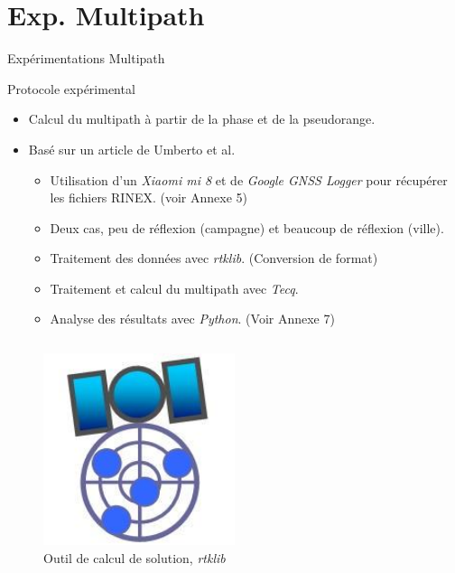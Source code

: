 \documentclass[xcolor=dvipsnames,envcountsect]{beamer}
\begin{document}
\section{Exp. Multipath}
\begin{frame}
	\centering
	\begin{block}
		\scshape
		\begin{center}
			\Huge Expérimentations Multipath
		\end{center}
	\end{block}
\end{frame}

\begin{frame}{Protocole expérimental}
	\begin{itemize}
		\item Calcul du multipath à partir de la phase et de la pseudorange.
		\item Basé sur un article de Umberto et al. \cite{mi8}
		\begin{itemize}
			\item Utilisation d'un \textit{Xiaomi mi 8} et de \textit{Google GNSS Logger} pour récupérer les fichiers RINEX. {\tiny (voir Annexe 5)}
			\item Deux cas, peu de réflexion (campagne) et beaucoup de réflexion (ville).
			\item Traitement des données avec \textit{rtklib}. (Conversion de format)
			\item Traitement et calcul du multipath avec \textit{Tecq}.
			\item Analyse des résultats avec \textit{Python}. {\tiny (Voir Annexe 7)}
		\end{itemize}
	\end{itemize}
	\begin{columns}
		\begin{column}{0.3\textwidth}
			\begin{figure}
				\centering
				\includegraphics[width=0.5\textwidth]{./Figures/rtklib.jpg}
				\caption {Outil de calcul de solution, \textit{rtklib}}
			\end{figure}		
		\end{column}


\end{columns}
\end{frame}
\end{document}
